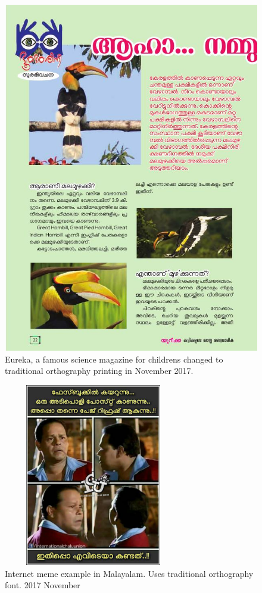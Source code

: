 \documentclass[10pt]{article}
\begin{document}
\begin{figure}[H]
	\centering
	\includegraphics[scale=0.5]{images/2017-Eureka.jpg}
	\caption{Eureka, a famous science magazine for childrens changed to traditional orthography printing in November 2017.}
\end{figure}


\begin{figure}[H]
	\centering
	\includegraphics[width=0.7\textwidth, height=8cm]{images/2017-icu-meme.jpg}
	\caption{Internet meme example in Malayalam. Uses traditional orthography font. 2017 November}
\end{figure}
\end{document}
